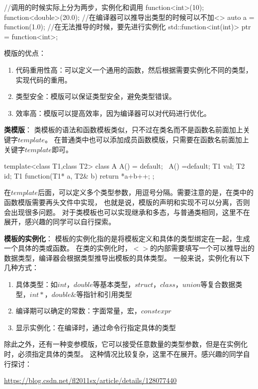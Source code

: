 \begin{tcode}
//调用的时候实际上分为两步，实例化和调用
function<int>(10);
function<double>(20.0);
//在编译器可以推导出类型的时候可以不加<>
auto a = function(1.0);
//在无法推导的时候，要先进行实例化
std::function<int(int)> ptr = function<int>;
\end{tcode}

模版的优点：
\begin{enumerate}
    \item 代码重用性高：可以定义一个通用的函数，然后根据需要实例化不同的类型，实现代码的重用。
    \item 类型安全：模版可以保证类型安全，避免类型错误。
    \item 效率高：模版可以提高效率，因为编译器可以对代码进行优化。
\end{enumerate}

\textbf{类模版}：
类模板的语法和函数模板类似，只不过在类名而不是函数名前面加上关键字$template$。
在普通类中也可以添加成员函数模版，只需要在函数名前面加上关键字$template$即可。

\begin{tcode}
template<class T1,class T2>
class A{
    A() = default;
    ~A() =default;
    T1 val;
    T2 id;
    T1 function(T1* a, T2& b){
        return *a+b++;
    }
};
\end{tcode}

在$template$后面，可以定义多个类型参数，用逗号分隔。需要注意的是，在类中的函数模版需要再头文件中实现，
也就是说，模版的声明和实现不可以分离，否则会出现很多问题。
对于类模板也可以实现继承和多态，与普通类相同，这里不在展开，感兴趣的同学可以自行探索。

\textbf{模板的实例化}：
模板的实例化指的是将模板定义和具体的类型绑定在一起，生成一个具体的类或函数。
在类的实例化时，$<>$的内部需要填写一个可以推导出的数据类型，编译器会根据类型推导出模板的具体类型。
一般来说，实例化有以下几种方式：

\begin{enumerate}
    \item 具体类型：如$int$，$double$等基本类型，$struct$，$class$，$union$等复合数据类型，$int*$，$double\&$等指针和引用类型
    \item 编译期可以确定的常数：字面常量，宏，$constexpr$
    \item 显示实例化：在编译时，通过命令行指定具体的类型
\end{enumerate}

除此之外，还有一种变参模版，它可以接受任意数量的类型参数，但是在实例化时，必须指定具体的类型。
这种情况比较复杂，这里不在展开。感兴趣的同学自行探讨：

\url{https://blog.csdn.net/fl2011sx/article/details/128077440}
